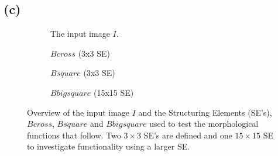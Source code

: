 \documentclass{article}
\begin{document}
\subsection*{(c)}
\begin{figure}[H]
     \centering
     \begin{subfigure}[b]{0.75\textwidth}
         \centering
         
         \caption{The input image $I$.}
         \label{fig:wirebondmask-image}
     \end{subfigure}
     \newline
     \hfill
     \begin{subfigure}[b]{0.33\textwidth}
         \centering
         
         \caption{$Bcross$ (3x3 SE)}
         \label{fig:Bcross}
     \end{subfigure}
     \hfill
     \begin{subfigure}[b]{0.33\textwidth}
         \centering
         
         \caption{$Bsquare$  (3x3 SE)}
         \label{fig:Bsquare}
     \end{subfigure}
     \hfill
     \begin{subfigure}[b]{0.33\textwidth}
         \centering
         
         \caption{$Bbigsquare$ (15x15 SE)}
         \label{fig:Bbigsquare}
     \end{subfigure}
     
    \caption{Overview of the input image $I$ and the Structuring Elements (SE's), $Bcross$, $Bsquare$ and $Bbigsquare$ used to test the morphological functions that follow. Two $3 \times 3$ SE's are defined and one $15 \times 15$ SE to investigate functionality using a larger SE.}
    \label{fig:structuring-elements-overview}
\end{figure}
\end{document}
